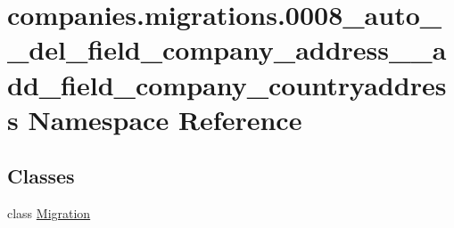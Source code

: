 \hypertarget{namespacecompanies_1_1migrations_1_10008__auto____del__field__company__address____add__field__company__countryaddress}{\section{companies.\-migrations.0008\-\_\-auto\-\_\-\-\_\-del\-\_\-field\-\_\-company\-\_\-address\-\_\-\-\_\-add\-\_\-field\-\_\-company\-\_\-countryaddress Namespace Reference}
\label{namespacecompanies_1_1migrations_1_10008__auto____del__field__company__address____add__field__company__countryaddress}
}
\subsection*{Classes}
\begin{DoxyCompactItemize}
\item 
class \hyperlink{classcompanies_1_1migrations_1_10008__auto____del__field__company__address____add__field__company__countryaddress_1_1_migration}{Migration}
\end{DoxyCompactItemize}
